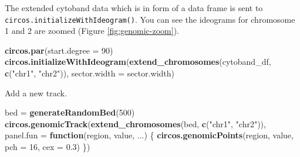 \documentclass[]{book}
\newenvironment{Shaded}{\begin{snugshade}}{\end{snugshade}}
\newcommand{\KeywordTok}[1]{\textcolor[rgb]{0.13,0.29,0.53}{\textbf{#1}}}
\newcommand{\DataTypeTok}[1]{\textcolor[rgb]{0.13,0.29,0.53}{#1}}
\newcommand{\DecValTok}[1]{\textcolor[rgb]{0.00,0.00,0.81}{#1}}
\newcommand{\FloatTok}[1]{\textcolor[rgb]{0.00,0.00,0.81}{#1}}
\newcommand{\StringTok}[1]{\textcolor[rgb]{0.31,0.60,0.02}{#1}}
\newcommand{\CommentTok}[1]{\textcolor[rgb]{0.56,0.35,0.01}{\textit{#1}}}
\newcommand{\ControlFlowTok}[1]{\textcolor[rgb]{0.13,0.29,0.53}{\textbf{#1}}}
\newcommand{\OperatorTok}[1]{\textcolor[rgb]{0.81,0.36,0.00}{\textbf{#1}}}
\newcommand{\NormalTok}[1]{#1}
\theoremstyle{definition}
\theoremstyle{definition}
\theoremstyle{remark}
\begin{document}
\begin{Shaded}
\end{Shaded}

The extended cytoband data which is in form of a data frame is sent to
\texttt{circos.initializeWithIdeogram()}. You can see the ideograms for
chromosome 1 and 2 are zoomed (Figure \ref{fig:genomic-zoom}).

\begin{Shaded}
\begin{Highlighting}[]
\KeywordTok{circos.par}\NormalTok{(}\DataTypeTok{start.degree =} \DecValTok{90}\NormalTok{)}
\KeywordTok{circos.initializeWithIdeogram}\NormalTok{(}\KeywordTok{extend_chromosomes}\NormalTok{(cytoband_df, }\KeywordTok{c}\NormalTok{(}\StringTok{"chr1"}\NormalTok{, }\StringTok{"chr2"}\NormalTok{)), }
    \DataTypeTok{sector.width =}\NormalTok{ sector.width)}
\end{Highlighting}
\end{Shaded}

Add a new track.

\begin{Shaded}
\begin{Highlighting}[]
\NormalTok{bed =}\StringTok{ }\KeywordTok{generateRandomBed}\NormalTok{(}\DecValTok{500}\NormalTok{)}
\KeywordTok{circos.genomicTrack}\NormalTok{(}\KeywordTok{extend_chromosomes}\NormalTok{(bed, }\KeywordTok{c}\NormalTok{(}\StringTok{"chr1"}\NormalTok{, }\StringTok{"chr2"}\NormalTok{)),}
    \DataTypeTok{panel.fun =} \ControlFlowTok{function}\NormalTok{(region, value, ...) \{}
        \KeywordTok{circos.genomicPoints}\NormalTok{(region, value, }\DataTypeTok{pch =} \DecValTok{16}\NormalTok{, }\DataTypeTok{cex =} \FloatTok{0.3}\NormalTok{)}
\NormalTok{\})}
\end{Highlighting}
\end{Shaded}
\end{document}
